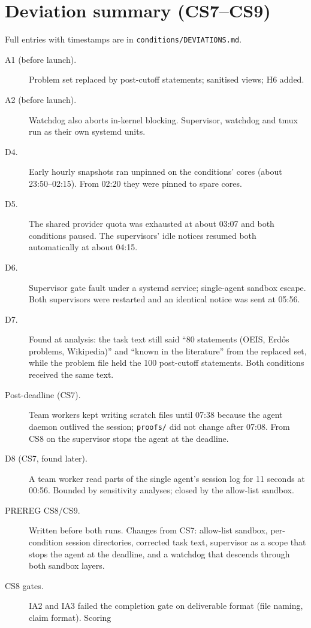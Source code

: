 \documentclass[11pt]{article}
\begin{document}



\appendix
\section{Deviation summary (CS7--CS9)}
\label{app:deviations}
Full entries with timestamps are in \texttt{conditions/DEVIATIONS.md}.
\begin{description}
  \item[A1 (before launch).] Problem set replaced by post-cutoff statements; sanitised views; H6 added.
  \item[A2 (before launch).] Watchdog also aborts in-kernel blocking. Supervisor, watchdog and tmux run as their own
    systemd units.
  \item[D4.] Early hourly snapshots ran unpinned on the conditions' cores (about 23:50--02:15). From 02:20 they were
    pinned to spare cores.
  \item[D5.] The shared provider quota was exhausted at about 03:07 and both conditions paused. The supervisors' idle
    notices resumed both automatically at about 04:15.
  \item[D6.] Supervisor gate fault under a systemd service; single-agent sandbox escape. Both supervisors were restarted
    and an identical notice was sent at 05:56.
  \item[D7.] Found at analysis: the task text still said ``80 statements (OEIS, Erd\H{o}s problems, Wikipedia)'' and
    ``known in the literature'' from the replaced set, while the problem file held the 100 post-cutoff statements.
    Both conditions received the same text.
  \item[Post-deadline (CS7).] Team workers kept writing scratch files until 07:38 because the agent daemon outlived
    the session; \texttt{proofs/} did not change after 07:08. From CS8 on the supervisor stops the agent at the
    deadline.
  \item[D8 (CS7, found later).] A team worker read parts of the single agent's session log for 11 seconds at 00:56.
    Bounded by sensitivity analyses; closed by the allow-list sandbox.
  \item[PREREG CS8/CS9.] Written before both runs. Changes from CS7: allow-list sandbox, per-condition session
    directories, corrected task text, supervisor as a scope that stops the agent at the deadline, and a watchdog that
    descends through both sandbox layers.
  \item[CS8 gates.] IA2 and IA3 failed the completion gate on deliverable format (file naming, claim format). Scoring

\end{description}
\end{document}

